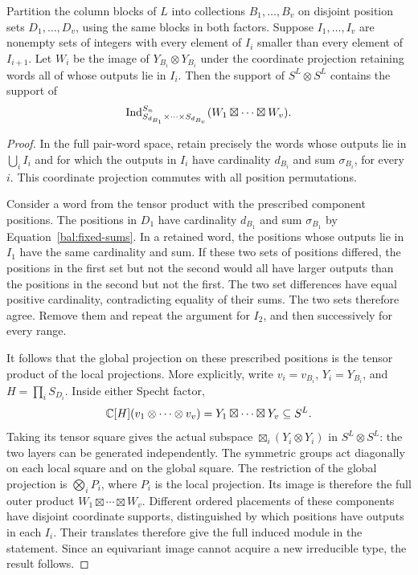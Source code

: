 \begin{lemma}
\label{lem:balance-separation}
Partition the column blocks of $L$ into collections
$B_1,\ldots,B_v$ on disjoint position sets $D_1,\ldots,D_v$,
using the same blocks in both factors. Suppose $I_1,\ldots,I_v$ are
nonempty sets of integers with every element of $I_i$ smaller than
every element of $I_{i+1}$. Let $W_i$ be the image of
$Y_{B_i}\otimes Y_{B_i}$ under the coordinate projection retaining
words all of whose outputs lie in $I_i$. Then the support of
$S^L\otimes S^L$ contains the support of
\[
 \operatorname{Ind}_{S_{d_{B_1}}\times\cdots\times S_{d_{B_v}}}^{S_n}
       (W_1\boxtimes\cdots\boxtimes W_v).
\]
\end{lemma}

\begin{proof}
In the full pair-word space, retain precisely the words whose
outputs lie in $\bigcup_i I_i$ and for which the outputs in $I_i$
have cardinality $d_{B_i}$ and sum $\sigma_{B_i}$, for every $i$.
This coordinate projection commutes with all position permutations.

Consider a word from the tensor product with the prescribed
component positions. The positions in $D_1$ have
cardinality $d_{B_1}$ and sum $\sigma_{B_1}$ by
Equation~\eqref{bal:fixed-sums}.  In a retained word, the positions
whose outputs lie in $I_1$ have the same cardinality and sum.
If these two sets of positions differed, the positions in the first
set but not the second would all have larger outputs than the
positions in the second but not the first.  The two set differences
have equal positive cardinality, contradicting equality of their
sums.  The two sets therefore agree.  Remove them and repeat the
argument for $I_2$, and then successively for every range.

It follows that the global projection on these prescribed positions
is the tensor product of the local projections. More explicitly,
write $v_i=v_{B_i}$, $Y_i=Y_{B_i}$, and
$H=\prod_i S_{D_i}$. Inside either Specht factor,
\[
 \mathbb C[H](v_1\otimes\cdots\otimes v_v)
       =Y_1\boxtimes\cdots\boxtimes Y_v\subseteq S^L.
\]
Taking its tensor square gives the actual subspace
$\boxtimes_i(Y_i\otimes Y_i)$ in $S^L\otimes S^L$: the two
layers can be generated independently. The symmetric groups act
diagonally on each local square and on the global square. The
restriction of the global projection is $\bigotimes_i P_i$, where $P_i$ is the
local projection.  Its image is therefore the full outer product
$W_1\boxtimes\cdots\boxtimes W_v$.
Different ordered placements of these components have disjoint
coordinate supports, distinguished by which positions have outputs
in each $I_i$.  Their translates therefore give the full induced
module in the statement.  Since an equivariant image cannot acquire
a new irreducible type, the result follows.
\end{proof}

